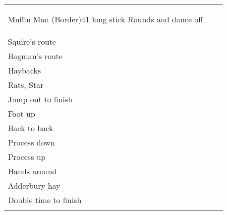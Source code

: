 \documentclass[12pt,a4paper]{article}
\begin{document}
\begin{tabular}{|l|l|l|}
\begin{dance}{Muffin Man (Border)}{4}{1 long stick}
Rounds and dance off
\end{dance}
&
\begin{dance}{Dilwyn (Border)}{4}{1 long stick}
{\it Start with song and sticking} \\
Squire's route \\
Bagman's route \\
Haybacks \\
Rats, Star \\
Jump out to finish
\end{dance}
&
\begin{dance}{Horsham Butchers (Adderb${}^{\mbox{\footnotesize\itshape y}}$)}{6}{1 long stick}
Song \\
Foot up \\
Back to back \\
Process down \\
Process up \\
Hands around \\
Adderbury hay \\
Double time to finish \\
\end{dance}

 \\ \hline 


\end{tabular}
\end{document}
